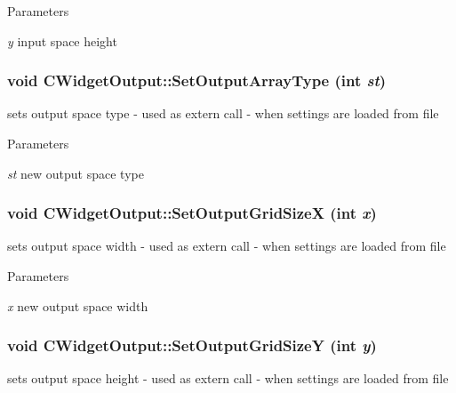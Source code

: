 \begin{DoxyParams}{Parameters}
\item[{\em y}]input space height \end{DoxyParams}
\hypertarget{classCWidgetOutput_a91ef6edea639a31229e15b9659b64954}{
\subsubsection[{SetOutputArrayType}]{\setlength{\rightskip}{0pt plus 5cm}void CWidgetOutput::SetOutputArrayType (int {\em st})}}
\label{classCWidgetOutput_a91ef6edea639a31229e15b9659b64954}
sets output space type -\/ used as extern call -\/ when settings are loaded from file


\begin{DoxyParams}{Parameters}
\item[{\em st}]new output space type \end{DoxyParams}
\hypertarget{classCWidgetOutput_a1c5fd5000d450fc31ad5246efc914a41}{
\subsubsection[{SetOutputGridSizeX}]{\setlength{\rightskip}{0pt plus 5cm}void CWidgetOutput::SetOutputGridSizeX (int {\em x})}}
\label{classCWidgetOutput_a1c5fd5000d450fc31ad5246efc914a41}
sets output space width -\/ used as extern call -\/ when settings are loaded from file


\begin{DoxyParams}{Parameters}
\item[{\em x}]new output space width \end{DoxyParams}
\hypertarget{classCWidgetOutput_ad30ea04a0d848bb26848b9f236f231a6}{
\subsubsection[{SetOutputGridSizeY}]{\setlength{\rightskip}{0pt plus 5cm}void CWidgetOutput::SetOutputGridSizeY (int {\em y})}}
\label{classCWidgetOutput_ad30ea04a0d848bb26848b9f236f231a6}
sets output space height -\/ used as extern call -\/ when settings are loaded from file


